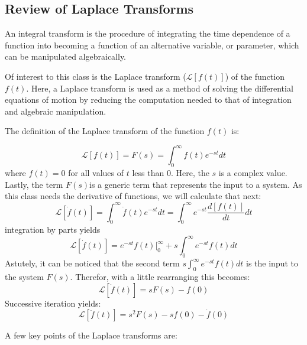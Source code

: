 \documentclass[12pt,a4paper]{article}
\newcommand{\Laplace}[1]{\ensuremath{\mathcal{L}{\left[#1\right]}}}
\begin{document}
		\subsection*{Review of Laplace Transforms}
		
		 An integral transform is the procedure of integrating the time dependence of a function into becoming a function of an alternative variable, or parameter, which can be manipulated algebraically. 
		
		Of interest to this class is the Laplace transform ($\Laplace{f(t)}$) of the function $f(t)$. Here, a Laplace transform is used as a method of solving the differential equations of motion by reducing the computation needed to that of integration and algebraic manipulation. 
		
		The definition of the Laplace transform of the function $f(t)$ is:
		
		\begin{equation}
				\Laplace{f(t)} = F(s) = \int_{0}^{\infty} f(t)e^{-st}dt
		\end{equation}
		where $f(t)=0$ for all values of $t$ less than 0. Here, the $s$ is a complex value. Lastly, the term $F(s)$is a generic term that  represents the input to a system. As this class needs the derivative of functions, we will calculate that next:
		\begin{equation}
			\Laplace{\dot{f}(t)} = \int_{0}^{\infty} \dot{f}(t)e^{-st}dt = \int_{0}^{\infty} e^{-st}\frac{d[f(t)]}{dt}dt 
		\end{equation}		
		integration by parts yields
		\begin{equation}
			\Laplace{\dot{f}(t)} = e^{-st}f(t)\Big|_0^\infty+s\int_{0}^{\infty}e^{-st}f(t)dt
		\end{equation}
		Astutely, it can be noticed that the second term $s\int_{0}^{\infty}e^{-st}f(t)dt$
		is the input to the system $F(s)$. Therefor, with a little rearranging this becomes:
		\begin{equation}
			\Laplace{\dot{f}(t)} = sF(s)-f(0)
		\end{equation}
		Successive iteration yields:
		\begin{equation}
			\Laplace{\ddot{f}(t)} = s^2F(s)-sf(0)-\dot{f}(0)
		\end{equation}
		
		A few key points of the Laplace transforms are:
		
\end{document}
